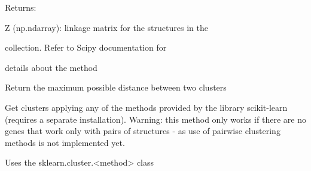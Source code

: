 \documentclass[letterpaper,10pt,english]{sphinxmanual}
\begin{document}
\begin{fulllineitems}
\begin{fulllineitems}
\begin{DUlineblock}{0em}
\item[] Returns:
\item[]
\begin{DUlineblock}{\DUlineblockindent}
\item[] Z (np.ndarray): linkage matrix for the structures in the
\item[]
\begin{DUlineblock}{\DUlineblockindent}
\item[] collection. Refer to Scipy documentation for
\item[] details about the method
\end{DUlineblock}
\end{DUlineblock}
\end{DUlineblock}

\end{fulllineitems}


\begin{fulllineitems}
\label{doctree/soprano.analyse.phylogen.phylogenclust:soprano.analyse.phylogen.phylogenclust.PhylogenCluster.get_max_cluster_dist}
Return the maximum possible distance between two clusters

\end{fulllineitems}


\begin{fulllineitems}
\label{doctree/soprano.analyse.phylogen.phylogenclust:soprano.analyse.phylogen.phylogenclust.PhylogenCluster.get_sklearn_clusters}
Get clusters applying any of the methods provided by the library
scikit-learn (requires a separate installation).
Warning: this method only works if there are no genes that work only
with pairs of structures - as use of pairwise clustering methods is
not implemented yet.

Uses the sklearn.cluster.\textless{}method\textgreater{} class


\end{fulllineitems}
\end{fulllineitems}
\end{document}
